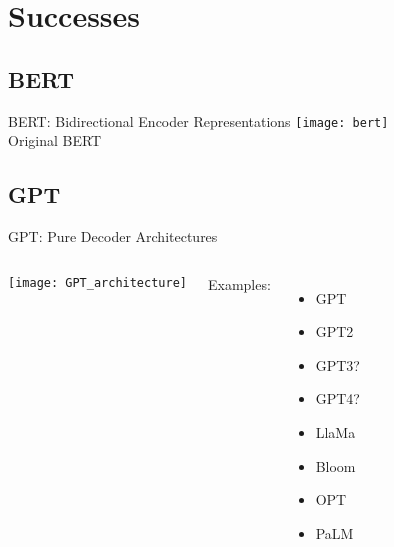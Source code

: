 \section{Successes}
\subsection{BERT}
\begin{frame}[c]{BERT: Bidirectional Encoder Representations}
    \texttt{[image: bert]} \\
    \large
    Original BERT \cite{devlin_bert_2018}
\end{frame}

\subsection{GPT}
\begin{frame}[c]{GPT: Pure Decoder Architectures}
    \begin{columns}
        \begin{minipage}[c][\textheight][c]{\linewidth}
            \texttt{[image: GPT\_architecture]} \\
        \end{minipage}
        \begin{minipage}[c][\textheight][c]{\linewidth}
            \large
            Examples:
            \begin{itemize}
                \item GPT \cite{radford_improving_2018}
                \item GPT2 \cite{radford_language_2019}
                \item GPT3? \cite{brown_language_2020}
                \item GPT4? \cite{openai_gpt4_2023}
                \item LlaMa \cite{touvron_llama_2023}
                \item Bloom \cite{workshop_bloom_2022}
                \item OPT \cite{zhang_opt_2022}
                \item PaLM \cite{chowdhery_palm_2022}
            \end{itemize}
        \end{minipage}
    \end{columns}
\end{frame}


